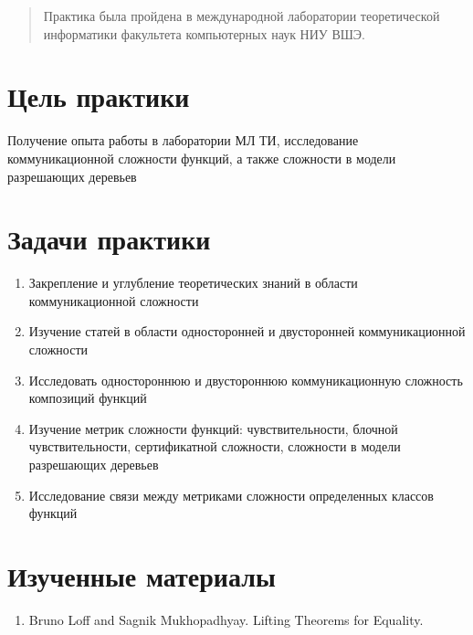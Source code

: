 \documentclass{article}
\begin{document}
\makeTitlePage



\begin{abstract}
    Практика была пройдена в международной лаборатории теоретической информатики факультета компьютерных наук НИУ ВШЭ.    
\end{abstract}
\tableofcontents

\section{Цель практики}
Получение опыта работы в лаборатории МЛ ТИ,
исследование коммуникационной сложности функций,
а также сложности в модели разрешающих деревьев
\section{Задачи практики}
\begin{enumerate}
    \item Закрепление и углубление теоретических знаний в
    области коммуникационной сложности
    \item Изучение статей в области односторонней и
    двусторонней коммуникационной сложности
    \item Исследовать одностороннюю и двустороннюю
    коммуникационную сложность композиций функций
    \item Изучение метрик сложности функций: чувствительности, блочной чувствительности, сертификатной сложности, сложности в модели разрешающих деревьев
    \item Исследование связи между метриками сложности определенных классов функций
\end{enumerate}
\section{Изученные материалы}
\begin{enumerate}
        \item Bruno Loff and Sagnik Mukhopadhyay. Lifting Theorems for Equality.\cite{loff}
\end{enumerate}
\end{document}
